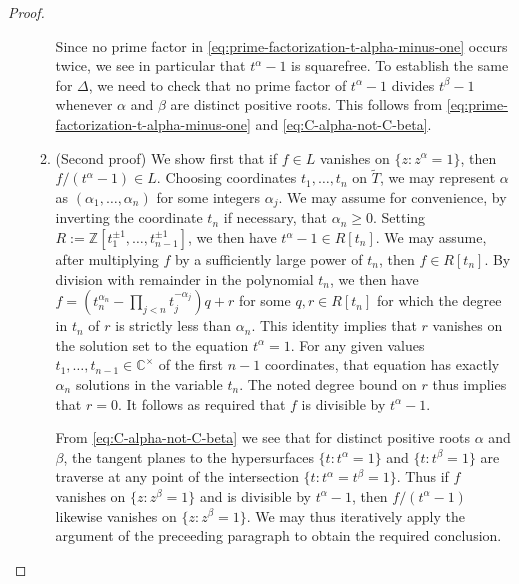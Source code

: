 \documentclass[reqno]{amsart} 
\begin{document}
\begin{proof}
\begin{enumerate}
\begin{enumerate}
      Since no prime factor in \eqref{eq:prime-factorization-t-alpha-minus-one} occurs twice, we see in particular that $t^\alpha - 1$ is squarefree.  To establish the same for $\Delta$, we need to check that no prime factor of $t^\alpha - 1$ divides $t^\beta - 1$ whenever $\alpha$ and $\beta$ are distinct positive roots.  This follows from \eqref{eq:prime-factorization-t-alpha-minus-one} and \eqref{eq:C-alpha-not-C-beta}.
    \item (Second proof) We show first that if $f \in L$ vanishes on $\{z : z^\alpha = 1\}$, then $f / (t^\alpha - 1) \in L$.  Choosing coordinates $t_1,\dotsc,t_n$ on $\tilde{T}$, we may represent $\alpha$ as $(\alpha_1,\dotsc,\alpha_n)$ for some integers $\alpha_j$.  We may assume for convenience, by inverting the coordinate $t_n$ if necessary, that $\alpha_n \geq 0$.  Setting $R := \mathbb{Z}[t_1^{\pm 1}, \dotsc, t_{n-1}^{\pm 1}]$, we then have $t^{\alpha} - 1 \in R[t_n]$.  We may assume, after multiplying $f$ by a sufficiently large power of $t_n$, then $f \in R[t_n]$.  By division with remainder in the polynomial $t_n$, we then have $f = (t_n^{\alpha_n} - \prod_{j < n} t_j^{-\alpha_j}) q + r$ for some $q, r \in R[t_n]$ for which the degree in $t_n$ of $r$ is strictly less than $\alpha_n$.  This identity implies that $r$ vanishes on the solution set to the equation $t^\alpha = 1$.  For any given values $t_1,\dotsc,t_{n-1} \in \mathbb{C}^\times$ of the first $n-1$ coordinates, that equation has exactly $\alpha_n$ solutions in the variable $t_n$.  The noted degree bound on $r$ thus implies that $r=0$.  It follows as required that $f$ is divisible by $t^\alpha - 1$.

      From \eqref{eq:C-alpha-not-C-beta} we see that for distinct positive roots $\alpha$ and $\beta$, the tangent planes to the hypersurfaces $\{t : t^\alpha = 1\}$ and $\{t : t^\beta = 1\}$ are traverse at any point of the intersection $\{t : t^\alpha = t^\beta = 1\}$.  Thus if $f$ vanishes on $\{z : z^\beta = 1\}$ and is divisible by $t^\alpha -1$, then $f / (t^\alpha - 1)$ likewise vanishes on $\{z : z^\beta = 1\}$.  We may thus iteratively apply the argument of the preceeding paragraph to obtain the required conclusion.
    \end{enumerate}
    

\end{enumerate}
\end{proof}
\end{document}
